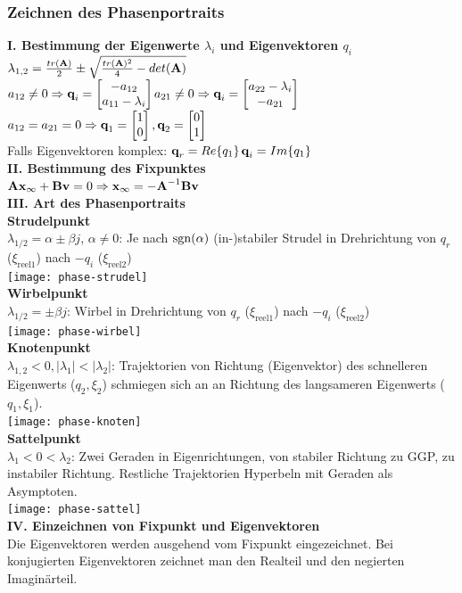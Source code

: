\documentclass[fs, footer]{latex4ei}
\begin{document}
\begin{multicols*}{4}
    \subsubsection{Zeichnen des Phasenportraits}
    \textbf{I. Bestimmung der Eigenwerte $\lambda_i$ und Eigenvektoren $q_i$}\\
    $\lambda_{1,2} = \frac{tr(\textbf{A})}{2} \pm \sqrt{\frac{tr(\textbf{A})^2}{4}-det(\textbf{A})}$\\
    $a_{12} \neq 0 \Rightarrow \textbf{q}_i = \begin{bmatrix} -a_{12}\\a_{11}-\lambda_i \end{bmatrix}$\quad $a_{21} \neq 0 \Rightarrow \textbf{q}_i = \begin{bmatrix} a_{22}-\lambda_i\\-a_{21} \end{bmatrix}$\quad$a_{12} = a_{21} = 0 \Rightarrow \textbf{q}_1 = \begin{bmatrix} 1\\0 \end{bmatrix}, \textbf{q}_2 = \begin{bmatrix} 0\\1 \end{bmatrix}$\\
    Falls Eigenvektoren komplex: $\textbf{q}_r = Re\{q_1\}$\qquad$\textbf{q}_i = Im\{q_1\}$\\
    \textbf{II. Bestimmung des Fixpunktes}\\
    $\textbf{A}\textbf{x}_\infty + \textbf{B}\textbf{v} = 0 \Rightarrow \textbf{x}_\infty = -\textbf{A}^{-1} \textbf{B}\textbf{v}$\\
    \textbf{III. Art des Phasenportraits}\\
    \textbf{Strudelpunkt}\\
    $\lambda_{1/2} = \alpha \pm \beta j$, $\alpha \neq 0$: Je nach $\operatorname{sgn}(\alpha)$ (in-)stabiler Strudel in Drehrichtung von $q_r$ ($\xi_{\text{reel}1}$) nach $-q_i$ ($\xi_{\text{reel}2}$)\\
    \texttt{[image: phase-strudel]}\\
    \textbf{Wirbelpunkt}\\
    $\lambda_{1/2} = \pm \beta j$: Wirbel in Drehrichtung von $q_r$ ($\xi_{\text{reel}1}$) nach $-q_i$ ($\xi_{\text{reel}2}$)\\
    \texttt{[image: phase-wirbel]}\\
    \textbf{Knotenpunkt}\\
    $\lambda_{1,2} < 0, |\lambda_1| < |\lambda_2|$: Trajektorien von Richtung (Eigenvektor) des schnelleren Eigenwerts ($q_2, \xi_2$) schmiegen sich an an Richtung des langsameren Eigenwerts ($q_1, \xi_1$).\\
    \texttt{[image: phase-knoten]}\\
    \textbf{Sattelpunkt}\\
    $\lambda_1 < 0 < \lambda_2 $: Zwei Geraden in Eigenrichtungen, von stabiler Richtung zu GGP, zu instabiler Richtung. Restliche Trajektorien Hyperbeln mit Geraden als Asymptoten.\\
    \texttt{[image: phase-sattel]}\\
    \textbf{IV. Einzeichnen von Fixpunkt und Eigenvektoren}\\
    Die Eigenvektoren werden ausgehend vom Fixpunkt eingezeichnet. Bei konjugierten Eigenvektoren zeichnet man den Realteil und den negierten Imaginärteil.\\

\end{multicols*}
\end{document}
